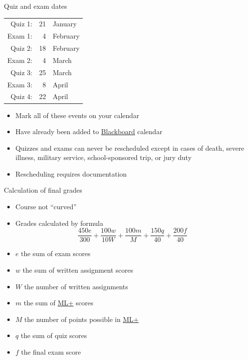 \documentclass[xcolor=dvipsnames]{beamer}
\theoremstyle{definition}
\begin{document}
\begin{frame}{Quiz and exam dates}
\begin{center}\begin{tabular}{rrl}
Quiz 1:&21&January\\
Exam 1:&4&February\\
Quiz 2:&18&February\\
Exam 2:&4&March\\
Quiz 3:&25&March\\
Exam 3:&8&April\\
Quiz 4:&22&April
\end{tabular}\end{center}
\begin{itemize}
\item Mark all of these events on your calendar
\item Have already been added to
\href{https://bb.its.iastate.edu}{\color{blue} Blackboard}
calendar
\item Quizzes and exams can \alert{never} be rescheduled
except in cases of death, severe illness, military service,
school-sponsored trip, or jury duty
\item Rescheduling requires documentation
\end{itemize}
\end{frame}

\begin{frame}{Calculation of final grades}
\begin{itemize}
\item Course not ``curved''
\item Grades calculated by formula
\[\frac{450e}{300}+\frac{100w}{10W}
+\frac{100m}{M}+\frac{150q}{40}+\frac{200f}{40}\]
\item $e$ the sum of exam scores
\item $w$ the sum of written assignment scores
\item $W$ the number of written assignments
\item $m$ the sum of
\href{http://iastate.mylabsplus.com}{\color{blue}ML+} scores
\item $M$ the number of points possible in
\href{http://iastate.mylabsplus.com}{\color{blue}ML+}
\item $q$ the sum of quiz scores
\item $f$ the final exam score
\end{itemize}
\end{frame}
\end{document}

